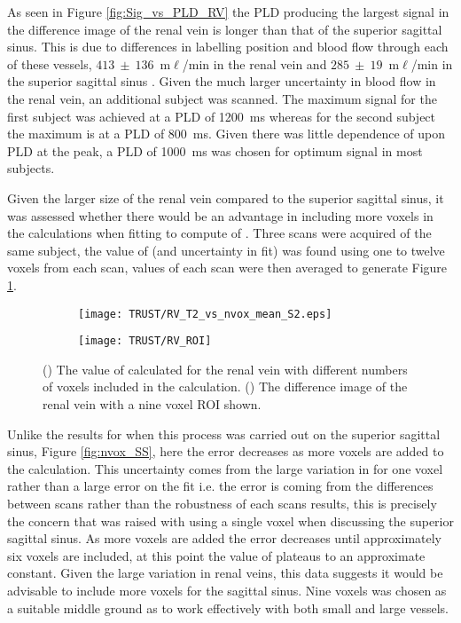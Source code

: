 \newpage
As seen in Figure \ref{fig:Sig_vs_PLD_RV} the \ac{PLD} producing the largest signal in the difference image of the renal vein is longer than that of the superior sagittal sinus. This is due to differences in labelling position and blood flow through each of these vessels, $413~\pm~136$~m$\ell$/min in the renal vein \cite{cox_multiparametric_2017} and $285~\pm~19$~m$\ell$/min in the superior sagittal sinus \cite{jordan_velocity_1994}. Given the much larger uncertainty in blood flow in the renal vein, an additional subject was scanned. The maximum signal for the first subject was achieved at a \ac{PLD} of 1200~ms whereas for the second subject the maximum is at a \ac{PLD} of 800~ms. Given there was little dependence of \ttwo upon \ac{PLD} at the peak, a \ac{PLD} of 1000~ms was chosen for optimum signal in most subjects.

Given the larger size of the renal vein compared to the superior sagittal sinus, it was assessed whether there would be an advantage in including more voxels in the calculations when fitting to compute of \ttwo. Three scans were acquired of the same subject, the value of \ttwo (and uncertainty in fit) was found using one to twelve voxels from each scan, \ttwo values of each scan were then averaged to generate Figure \ref{fig:nvox_RV}.  

\begin{figure}[H]
	\centering
	\begin{subfigure}[c]{0.47\textwidth}
		\centering
		\texttt{[image: TRUST/RV\_T2\_vs\_nvox\_mean\_S2.eps]}
		\caption{}
		\label{fig:nvox_RV}
	\end{subfigure}
	\hfill
	\begin{subfigure}[c]{0.47\textwidth}
		\centering
		\texttt{[image: TRUST/RV\_ROI]}
		\caption{}
		\label{fig:RV_ROI}
	\end{subfigure}
	\caption{() The value of \ttwo calculated for the renal vein with different numbers of voxels included in the calculation. () The difference image of the renal vein with a nine voxel \ac{ROI} shown.}
	\label{fig:nv_RV}
\end{figure}


Unlike the results for when this process was carried out on the superior sagittal sinus, Figure \ref{fig:nvox_SS}, here the error decreases as more voxels are added to the calculation. This uncertainty comes from the large variation in \ttwo for one voxel rather than a large error on the fit i.e. the error is coming from the differences between scans rather than the robustness of each scans results, this is precisely the concern that was raised with using a single voxel when discussing the superior sagittal sinus. As more voxels are added the error decreases until approximately six voxels are included, at this point the value of \ttwo plateaus to an approximate constant. Given the large variation in renal veins, this data suggests it would be advisable to include more voxels for the sagittal sinus. Nine voxels was chosen as a suitable middle ground as to work effectively with both small and large vessels.

